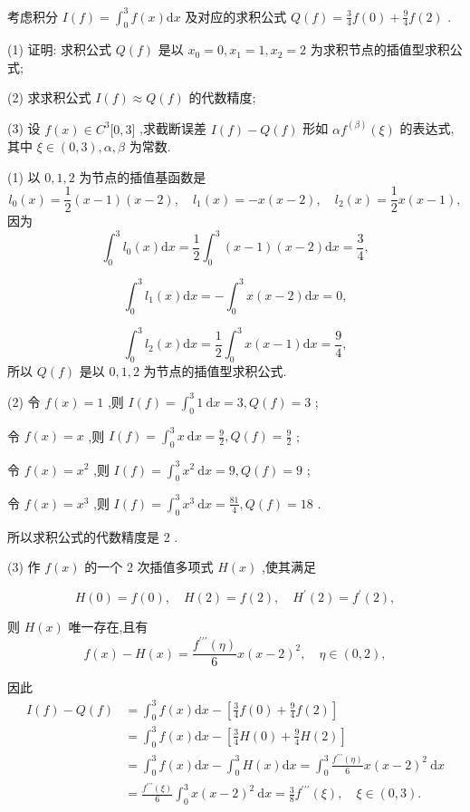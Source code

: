 \begin{tcolorbox}[enhanced,colback=10,colframe=9,breakable,coltitle=green!25!black,title=2024]

考虑积分 $I(f) = {{\int}}_{0}^{3}f(x)\mathrm{d}x$ 及对应的求积公式 $Q(f) = \frac{3}{4}f(0) + \frac{9}{4}f(2)$ .

(1) 证明: 求积公式 $Q(f)$ 是以 $x_{0} = 0,x_{1} = 1,x_{2} = 2$ 为求积节点的插值型求积公式;

(2) 求求积公式 $I(f) {\approx} Q(f)$ 的代数精度;

(3) 设 $f(x) {\in} C^{3}\lbrack 0,3\rbrack$ ,求截断误差 $I(f) {-} Q(f)$ 形如 $\alpha f^{(\beta)}(\xi)$ 的表达式,其中 $\xi {\in} (0,3),\alpha,\beta$ 为常数.
\tcblower

 (1) 以 $0,1,2$ 为节点的插值基函数是
$$l_{0}(x) = \frac{1}{2}(x {-} 1)(x {-} 2),\quad l_{1}(x) = {-} x(x {-} 2),\quad l_{2}(x) = \frac{1}{2}x(x {-} 1),$$
因为
$${{\int}}_{0}^{3}l_{0}(x)\mathrm{d}x = \frac{1}{2}{{\int}}_{0}^{3}(x {-} 1)(x {-} 2)\mathrm{d}x = \frac{3}{4},$$

$${{\int}}_{0}^{3}l_{1}(x)\mathrm{d}x = {-} {{\int}}_{0}^{3}x(x {-} 2)\mathrm{d}x = 0,$$

$${{\int}}_{0}^{3}l_{2}(x)\mathrm{d}x = \frac{1}{2}{{\int}}_{0}^{3}x(x {-} 1)\mathrm{d}x = \frac{9}{4},$$
所以 $Q(f)$ 是以 $0,1,2$ 为节点的插值型求积公式.

(2) 令 $f(x) = 1$ ,则 $I(f) = {{\int}}_{0}^{3}1\mathrm{\ d}x = 3,Q(f) = 3$ ;

令 $f(x) = x$ ,则 $I(f) = {{\int}}_{0}^{3}x\mathrm{\ d}x = \frac{9}{2},Q(f) = \frac{9}{2}$ ;

令 $f(x) = x^{2}$ ,则 $I(f) = {{\int}}_{0}^{3}x^{2}\mathrm{\ d}x = 9,Q(f) = 9$ ;

令 $f(x) = x^{3}$ ,则 $I(f) = {{\int}}_{0}^{3}x^{3}\mathrm{\ d}x = \frac{81}{4},Q(f) = 18$ .

所以求积公式的代数精度是 2 .

(3) 作 $f(x)$ 的一个 2 次插值多项式 $H(x)$ ,使其满足

$$H(0) = f(0),\quad H(2) = f(2),\quad H^{{\prime}}(2) = f^{{\prime}}(2),$$

则 $H(x)$ 唯一存在,且有
$$f(x) {-} H(x) = \frac{f^{{\prime}{\prime}{\prime}}(\eta)}{6}x{(x {-} 2)}^{2},\quad\eta {\in} (0,2),$$

因此
$$\begin{aligned}
    I(f) {-} Q(f) &= {{\int}}_{0}^{3}f(x)\mathrm{d}x {-} \left\lbrack \frac{3}{4}f(0) + \frac{9}{4}f(2) \right\rbrack\\&= {{\int}}_{0}^{3}f(x)\mathrm{d}x {-} \left\lbrack \frac{3}{4}H(0) + \frac{9}{4}H(2) \right\rbrack\\&= {{\int}}_{0}^{3}f(x)\mathrm{d}x {-} {{\int}}_{0}^{3}H(x)\mathrm{d}x = {{\int}}_{0}^{3}\frac{f^{{\prime}{\prime}{\prime}}(\eta)}{6}x{(x {-} 2)}^{2}\mathrm{\ d}x\\&= \frac{f^{{\prime}{\prime}{\prime}}(\xi)}{6}{{\int}}_{0}^{3}x{(x {-} 2)}^{2}\mathrm{\ d}x = \frac{3}{8}f^{{\prime}{\prime}{\prime}}(\xi),\quad\xi {\in} (0,3).
\end{aligned}$$


\end{tcolorbox}



